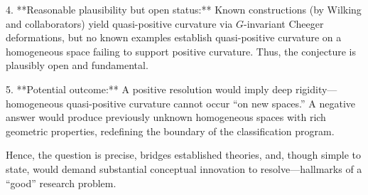 4. **Reasonable plausibility but open status:** Known constructions (by Wilking and collaborators) yield quasi-positive curvature via \(G\)-invariant Cheeger deformations, but no known examples establish quasi-positive curvature on a homogeneous space failing to support positive curvature. Thus, the conjecture is plausibly open and fundamental.

5. **Potential outcome:** A positive resolution would imply deep rigidity—homogeneous quasi-positive curvature cannot occur “on new spaces.” A negative answer would produce previously unknown homogeneous spaces with rich geometric properties, redefining the boundary of the classification program.

Hence, the question is precise, bridges established theories, and, though simple to state, would demand substantial conceptual innovation to resolve—hallmarks of a “good” research problem.
